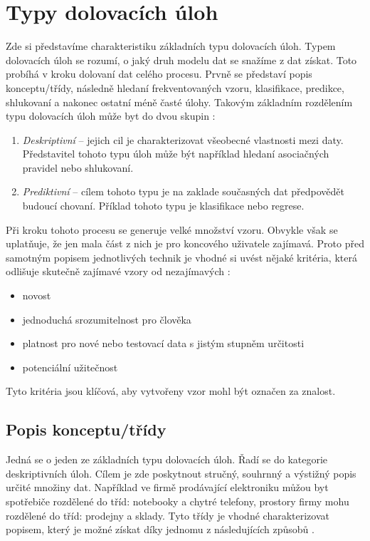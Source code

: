 \section{Typy dolovacích úloh}
\label{typyuloh}
Zde si představíme charakteristiku základních typu dolovacích úloh. Typem dolovacích úloh se rozumí, o jaký druh modelu dat se snažíme z dat získat. Toto probíhá v kroku dolovaní dat celého procesu. 
Prvně se představí popis konceptu/třídy, následně hledaní frekventovaných vzoru, klasifikace, predikce, shlukovaní a nakonec ostatní méně časté úlohy.
Takovým základním rozdělením typu dolovacích úloh může byt do dvou skupin \cite{Han}:

\begin{enumerate}
    \item  \textit{Deskriptivní} – jejich cil je charakterizovat všeobecné vlastnosti mezi daty. Představitel tohoto typu úloh může být například hledaní asociačných pravidel nebo shlukovaní.
    \item \textit{Prediktivní} – cílem tohoto typu je na zaklade současných dat předpovědět budoucí chovaní. Příklad tohoto typu je klasifikace nebo regrese.
\end{enumerate}

Při kroku tohoto procesu se generuje velké množství vzoru. Obvykle však se uplatňuje, že jen mala část z nich je pro koncového uživatele zajímavá. Proto před samotným popisem jednotlivých technik je vhodné si uvést nějaké kritéria, která odlišuje skutečně zajímavé vzory od nezajímavých \cite{Han}:

\begin{itemize}
    \item novost
    \item jednoduchá srozumitelnost pro člověka
    \item platnost pro nové nebo testovací data s jistým stupněm určitosti
    \item potenciální užitečnost
\end{itemize}

Tyto kritéria jsou klíčová, aby vytvořeny vzor mohl být označen za znalost.

\subsection*{Popis konceptu/třídy}
Jedná se o jeden ze základních typu dolovacích úloh. Řadí se do kategorie deskriptivních úloh. Cílem je zde poskytnout stručný, souhrnný a výstižný popis určité množiny dat. Například ve firmě prodávající elektroniku můžou byt spotřebiče rozdělené do tříd: notebooky a chytré telefony, prostory firmy mohu rozdělené do tříd: prodejny a sklady. Tyto třídy je vhodné charakterizovat popisem, který je možné získat díky jednomu z následujících způsobů \cite{Han}.

